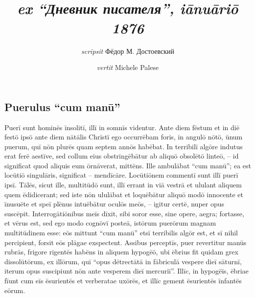 \documentclass[a4paper, 12pt]{article}
\title{
	\MyTitle\\
	\large\textit{ex ``\emph{Дневник писателя}'', iānuāriō 1876}
}
\author{\textit{scrīpsit} Фёдор М. Достоевский \and \textit{vertit} Michele Palese}
\date{}
\newcommand{\DisableFootNotes}{%
	\renewcommand{\footnote}[2][]{\relax}
}
\begin{document}
	
	\maketitle
	
	\DisableFootNotes
	
	\resetlinenumber
\begin{linenumbers}
	
	\section{Puerulus ``cum manū''}
	
	Puerī sunt hominēs īnsolitī, illī in somnīs videntur.
	Ante diem fēstum et in diē festō ipsō ante diem nātālis Chrīstī ego occurrēbam foris, in angulō nōtō, ūnum puerum, quī nōn plurēs quam septem annōs habēbat.
	In terribilī algōre\footnote{algor, algōris, \textit{m} = magnum frigidum} indutus erat ferē\footnote{ferē = prope} aestīve\footnote{aestīve < aestās}, sed collum eius obstringēbātur ab aliquō obsolētō linteō\footnote{linteum, linteī, \textit{n}}, -- id significat quod aliquis eum ōrnāverat, mittēns.
	Ille ambulābat ``cum manū''; ea est locūtiō singulāris, significat -- mendīcāre\footnote{mendīcō, mendīcās, mendīcāvī, mendīcātum, mendīcāre = pecuniam poscō}.
	Locūtiōnem commentī sunt\footnote{commīniscor, commīnisceris, commentus sum, commīniscī = excōgitō} illī puerī ipsī.
	Tālēs, sicut ille, multitūdō sunt, illī errant in viā vestrā et ululant aliquem quem ēdidicerant\footnote{ēdiscō = discō ut meminī};
	sed iste nōn ululābat et loquēbātur aliquō modō innocente et īnusuēte et speī plēnus intuēbātur\footnote{intueor, intuēris, intuitus sum, intuērī = aspiciō} oculōs meōs,
	-- igitur certē, nuper opus suscēpit\footnote{opus suscipiō = laborare incipiō}.
	Interrogātiōnibus meīs dīxit, sibi soror esse, sine opere, aegra;
	fortasse, et vērus est, sed ego modo cognōvī posteā, istōrum puerōrum magnam multitūdinem esse:
	eōs mittunt ``cum manū'' etsī terribilis algōr est, et sī nihil percipient, forsit eōs plāgae exspectent\footnote{eōs plāgae exspectent = verberentur}.
	Assibus perceptīs, puer revertitur manūs rubrās, frigore rigentēs\footnote{frigore rigēns = ob frigorem movī nōn potest} habēns in aliquem hypogēō\footnote{hypogēum, hypogēī, \textit{n} = pars domūs subterranea}, ubi ēbrius fit quidam grex dissolūtōrum, ex illōrum, quī ``opus dētrectātā in fābriculā vespere dieī sāturnī, iterum opus suscipiunt nōn ante vesperem dieī mercuriī''.
	Illīc, in hypogēīs, ēbriae fīunt cum eīs ēsurientēs\footnote{ēsuriēns, ēsurientis = is qui cibō carēt} et verberatae uxōrēs, et illīc gement\footnote{gemō, gemis, gemuī, gemitum, gemere $\approx$ vāgiō} ēsurientēs īnfantēs eōrum.

\end{linenumbers}
\end{document}

